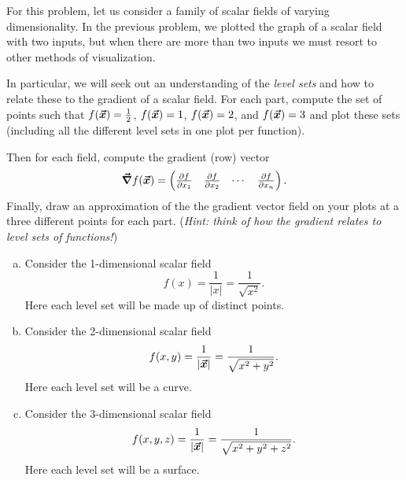 \documentclass[12pt]{article} %
\begin{document}
\begin{problem}
For this problem, let us consider a family of scalar fields of varying dimensionality. In the previous problem, we plotted the graph of a scalar field with two inputs, but when there are more than two inputs we must resort to other methods of visualization.

In particular, we will seek out an understanding of the \emph{level sets} and how to relate these to the gradient of a scalar field. For each part, compute the set of points such that $f(\boldsymbol{\vec{x}})=\frac{1}{2}$, $f(\boldsymbol{\vec{x}})=1$, $f(\boldsymbol{\vec{x}})=2$, and $f(\boldsymbol{\vec{x}})=3$ and plot these sets (including all the different level sets in one plot per function). 

Then for each field, compute the gradient (row) vector
\[
\boldsymbol{\vec{\nabla}} f(\boldsymbol{\vec{x}}) = \begin{pmatrix} \frac{\partial f}{\partial x_1} & \frac{\partial f}{\partial x_2} & \cdots & \frac{\partial f}{\partial x_n}\end{pmatrix}.
\]
Finally, draw an approximation of the the gradient vector field on your plots at a three different points for each part. (\emph{Hint: think of how the gradient relates to level sets of functions!})
\begin{enumerate}[(a)]
	\item Consider the 1-dimensional scalar field 
	\[
	f(x) = \frac{1}{|x|}=\frac{1}{\sqrt{x^2}}.
	\]
	Here each level set will be made up of distinct points.
	\item Consider the 2-dimensional scalar field
	\[
	f(x,y) = \frac{1}{|\boldsymbol{\vec{x}}|} = \frac{1}{\sqrt{x^2+y^2}}.
	\]
	Here each level set will be a curve.
	\item Consider the 3-dimensional scalar field
		\[
		f(x,y,z) = \frac{1}{|\boldsymbol{\vec{x}}|} = \frac{1}{\sqrt{x^2+y^2+z^2}}.
		\]
		Here each level set will be a surface.
\end{enumerate}
\end{problem}
\end{document}

